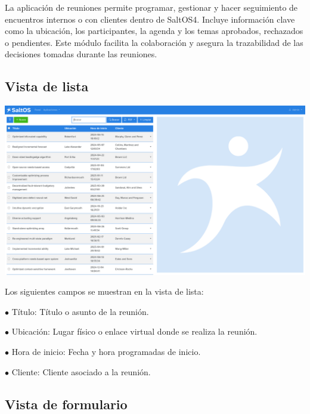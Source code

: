\documentclass[a4paper]{article}
\begin{document}
La aplicación de reuniones permite programar, gestionar y hacer seguimiento de encuentros internos o con clientes dentro de SaltOS4.
Incluye información clave como la ubicación, los participantes, la agenda y los temas aprobados, rechazados o pendientes.
Este módulo facilita la colaboración y asegura la trazabilidad de las decisiones tomadas durante las reuniones.

\hypertarget{toc68}{}
\subsection{Vista de lista}

\begin{center}\includegraphics[width=1\textwidth]{../ujest/snaps/test-screenshots-js-screenshots-crm-meetings-list-es-es-1-snap.png}\end{center}

Los siguientes campos se muestran en la vista de lista:

\begin{compactitem}
\item[\color{myblue}$\bullet$] Título: Título o asunto de la reunión.
\item[\color{myblue}$\bullet$] Ubicación: Lugar físico o enlace virtual donde se realiza la reunión.
\item[\color{myblue}$\bullet$] Hora de inicio: Fecha y hora programadas de inicio.
\item[\color{myblue}$\bullet$] Cliente: Cliente asociado a la reunión.
\end{compactitem}

\hypertarget{toc69}{}
\subsection{Vista de formulario}
\end{document}

